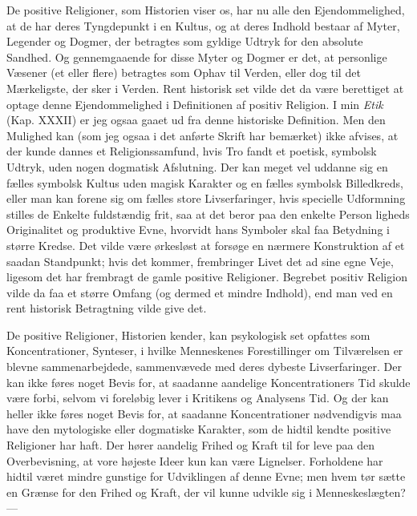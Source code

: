 \documentclass[12pt,a4paper,openany]{book}
\newcommand{\opage}[1]{\marginnote{\footnotesize\textit{[#1]}}}
\begin{document}
De positive Religioner, som Historien viser os, har nu alle den
Ejendommelighed, at de har deres Tyngdepunkt i en Kultus, og at deres
Indhold bestaar af Myter, Legender og Dogmer, der betragtes som gyldige
Udtryk for den absolute Sandhed. Og gennemgaaende for disse Myter og
Dogmer er det, at personlige Væsener (et eller flere) betragtes som
Ophav til Verden, eller dog til det Mærkeligste, der sker i Verden. Rent
historisk set vilde det da være berettiget at optage denne
Ejendommelighed i Definitionen af positiv Religion. I min \textit{Etik}
(Kap. XXXII) er jeg ogsaa gaaet ud fra denne historiske Definition. Men
den Mulighed kan (som jeg ogsaa i det anførte Skrift har bemærket) ikke
afvises, at der kunde dannes et Religionssamfund, hvis Tro fandt et
poetisk, symbolsk Udtryk, uden nogen dogmatisk Afslutning. Der kan meget
vel uddanne sig en fælles symbolsk Kultus uden magisk Karakter og en
fælles symbolsk Billedkreds, eller man kan forene sig om fælles store
Livserfaringer, hvis specielle Udformning stilles de Enkelte fuldstændig
frit, saa at det beror paa den enkelte Person%
\opage{172}ligheds Originalitet og produktive Evne, hvorvidt hans
Symboler skal faa Betydning i større Kredse. Det vilde være ørkesløst at
forsøge en nærmere Konstruktion af et saadan Standpunkt; hvis det
kommer, frembringer Livet det ad sine egne Veje, ligesom det har
frembragt de gamle positive Religioner. Begrebet positiv Religion vilde
da faa et større Omfang (og dermed et mindre Indhold), end man ved en
rent historisk Betragtning vilde give det.

De positive Religioner, Historien kender, kan psykologisk set opfattes
som Koncentrationer, Synteser, i hvilke Menneskenes Forestillinger om
Tilværelsen er blevne sammenarbejdede, sammenvævede med deres dybeste
Livserfaringer. Der kan ikke føres noget Bevis for, at saadanne
aandelige Koncentrationers Tid skulde være forbi, selvom vi foreløbig
lever i Kritikens og Analysens Tid. Og der kan heller ikke føres noget
Bevis for, at saadanne Koncentrationer nødvendigvis maa have den
mytologiske eller dogmatiske Karakter, som de hidtil kendte positive
Religioner har haft. Der hører aandelig Frihed og Kraft til for leve paa
den Overbevisning, at vore højeste Ideer kun kan være Lignelser.
Forholdene har hidtil været mindre gunstige for Udviklingen af denne
Evne; men hvem tør sætte en Grænse for den Frihed og Kraft, der vil
kunne udvikle sig i Menneskeslægten? ---
\end{document}

